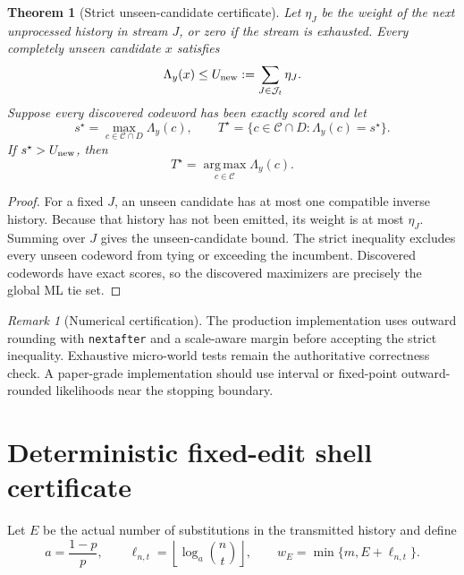 \documentclass[11pt]{article}
\newtheorem{theorem}{Theorem}
\theoremstyle{definition}
\theoremstyle{remark}
\newtheorem{remark}{Remark}
\newcommand{\C}{\mathcal C}
\newcommand{\J}{\mathcal J}
\newcommand{\argmax}{\operatorname*{arg\,max}}
\begin{document}
\begin{theorem}[Strict unseen-candidate certificate]
\label{thm:certificate}
Let $\eta_J$ be the weight of the next unprocessed history in stream $J$, or zero if the stream is exhausted.  Every completely unseen candidate $x$ satisfies
\[
\Lambda_y(x)\le U_{\rm new}:=\sum_{J\in\J_t}\eta_J.
\]
Suppose every discovered codeword has been exactly scored and let
\[
s^\star=\max_{c\in\C\cap D}\Lambda_y(c),\qquad
T^\star=\{c\in\C\cap D:\Lambda_y(c)=s^\star\}.
\]
If $s^\star>U_{\rm new}$, then
\[
T^\star=\argmax_{c\in\C}\Lambda_y(c).
\]
\end{theorem}
\begin{proof}
For a fixed $J$, an unseen candidate has at most one compatible inverse history.  Because that history has not been emitted, its weight is at most $\eta_J$.  Summing over $J$ gives the unseen-candidate bound.  The strict inequality excludes every unseen codeword from tying or exceeding the incumbent.  Discovered codewords have exact scores, so the discovered maximizers are precisely the global ML tie set.
\end{proof}

\begin{remark}[Numerical certification]
The production implementation uses outward rounding with \texttt{nextafter} and a scale-aware margin before accepting the strict inequality.  Exhaustive micro-world tests remain the authoritative correctness check.  A paper-grade implementation should use interval or fixed-point outward-rounded likelihoods near the stopping boundary.
\end{remark}

\section{Deterministic fixed-edit shell certificate}
Let $E$ be the actual number of substitutions in the transmitted history and define
\[
a=\frac{1-p}{p},\qquad
\ell_{n,t}=\left\lfloor\log_a\binom nt\right\rfloor,
\qquad
w_E=\min\{m,E+\ell_{n,t}\}.
\]
\end{document}
